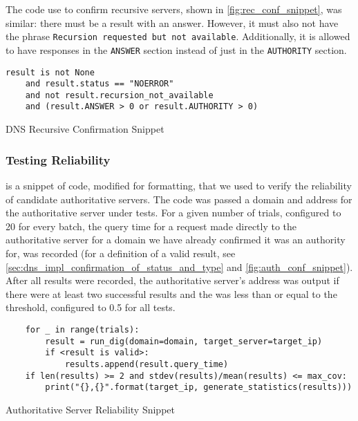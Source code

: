 The code use to confirm recursive servers, shown in \cref{fig:rec_conf_snippet}, was similar: there must be a result with an answer. However, it must also not have the phrase \texttt{Recursion requested but not available}. Additionally, it is allowed to have responses in the \texttt{ANSWER} section instead of just in the \texttt{AUTHORITY} section.

\begin{code}[H]
\centering
    \begin{verbatim}
result is not None 
    and result.status == "NOERROR" 
    and not result.recursion_not_available 
    and (result.ANSWER > 0 or result.AUTHORITY > 0)
    \end{verbatim}
    \caption{DNS Recursive Confirmation Snippet}
    \label{fig:rec_conf_snippet}
\end{code}

\subsubsection{Testing Reliability}

 is a snippet of code, modified for formatting, that we used to verify the reliability of candidate authoritative servers. The code was passed a domain and \ip address for the authoritative server under tests. For a given number of trials, configured to 20 for every batch, the query time for a request made directly to the authoritative server for a domain we have already confirmed it was an authority for, was recorded (for a definition of a valid result, see \cref{sec:dns_impl_confirmation_of_status_and_type} and \cref{fig:auth_conf_snippet}). After all results were recorded, the authoritative server's \ip address was output if there were at least two successful results and the \cv was less than or equal to the threshold, configured to 0.5 for all tests.

\begin{code}[H]
\centering
    \begin{verbatim}
    for _ in range(trials):
        result = run_dig(domain=domain, target_server=target_ip)
        if <result is valid>:
            results.append(result.query_time)
    if len(results) >= 2 and stdev(results)/mean(results) <= max_cov:
        print("{},{}".format(target_ip, generate_statistics(results)))
    \end{verbatim}
    \caption{Authoritative Server Reliability Snippet}
    \label{fig:auth_reliability_snippet}
\end{code}

